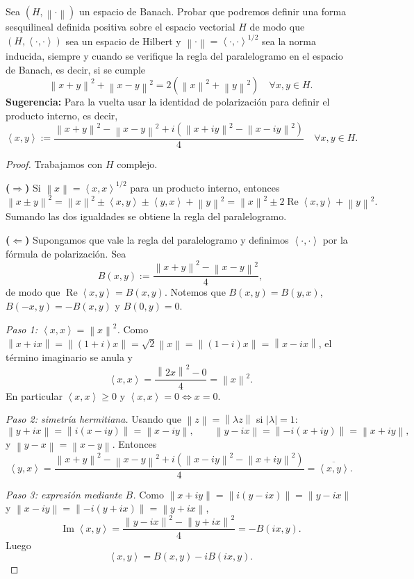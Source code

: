\documentclass{article}
\theoremstyle{definition}
\newcommand{\norm}[1]{\left\lVert #1 \right\rVert}       %
\newcommand{\ip}[2]{\left\langle #1, #2 \right\rangle}   %
\newcommand{\sii}{\iff}                                  %
\newenvironment{ejercicio}[1]{\begin{trivlist}
\item[\hskip \labelsep {\bfseries Ejercicio}\hskip \labelsep {\bfseries #1.}]}{\end{trivlist}}
\begin{document}
\begin{ejercicio}{2}
	Sea \( (H, \norm{\cdot}) \) un espacio de Banach. Probar que podremos definir una forma sesquilineal definida positiva sobre el espacio vectorial \( H \) de modo que \( (H, \ip{\cdot}{\cdot}) \) sea un espacio de Hilbert y \( \norm{\cdot} = \ip{\cdot}{\cdot}^{1/2} \) sea la norma inducida, siempre y cuando se verifique la regla del paralelogramo en el espacio de Banach, es decir, si se cumple
	\[ \norm{x+y}^2 + \norm{x-y}^2 = 2\left( \norm{x}^2 + \norm{y}^2 \right) \quad \forall x, y \in H. \]
	\textbf{Sugerencia:} Para la vuelta usar la identidad de polarización para definir el producto interno, es decir,
	\[ \ip{x}{y} := \frac{\norm{x+y}^2 - \norm{x-y}^2 + i \left( \norm{x+iy}^2 - \norm{x-iy}^2 \right)}{4} \quad \forall x, y \in H. \]
\end{ejercicio}
\begin{proof}
	Trabajamos con \( H \) complejo.

	\textbf{(\(\Rightarrow \))} Si \( \norm{x} = \ip{x}{x}^{1/2} \) para un producto interno, entonces
	\[ \norm{x \pm y}^2 = \norm{x}^2 \pm \ip{x}{y} \pm \ip{y}{x} + \norm{y}^2 = \norm{x}^2 \pm 2\operatorname{Re}\ip{x}{y} + \norm{y}^2. \]
	Sumando las dos igualdades se obtiene la regla del paralelogramo.

	\textbf{(\(\Leftarrow \))} Supongamos que vale la regla del paralelogramo y definimos \( \ip{\cdot}{\cdot} \) por la fórmula de polarización. Sea
	\[ B(x, y) := \frac{\norm{x+y}^2 - \norm{x-y}^2}{4}, \]
	de modo que \( \operatorname{Re}\ip{x}{y} = B(x, y) \). Notemos que \( B(x, y) = B(y, x) \), \( B(-x, y) = -B(x, y) \) y \( B(0, y) = 0 \).

	\emph{Paso 1: \( \ip{x}{x} = \norm{x}^2 \).} Como \( \norm{x + ix} = \norm{(1+i)x} = \sqrt{2}\norm{x} = \norm{(1-i)x} = \norm{x - ix} \), el término imaginario se anula y
	\[ \ip{x}{x} = \frac{\norm{2x}^2 - 0}{4} = \norm{x}^2. \]
	En particular \( \ip{x}{x} \ge 0 \) y \( \ip{x}{x} = 0 \sii x = 0 \).

	\emph{Paso 2: simetría hermitiana.} Usando que \( \norm{z} = \norm{\lambda z} \) si \( |\lambda| = 1 \):
	\[ \norm{y + ix} = \norm{i(x - iy)} = \norm{x - iy}, \qquad \norm{y - ix} = \norm{-i(x + iy)} = \norm{x + iy}, \]
	y \( \norm{y - x} = \norm{x - y} \). Entonces
	\[ \ip{y}{x} = \frac{\norm{x+y}^2 - \norm{x-y}^2 + i \left( \norm{x-iy}^2 - \norm{x+iy}^2 \right)}{4} = \overline{\ip{x}{y}}. \]

	\emph{Paso 3: expresión mediante \( B \).} Como \( \norm{x + iy} = \norm{i(y - ix)} = \norm{y - ix} \) y \( \norm{x - iy} = \norm{-i(y + ix)} = \norm{y + ix} \),
	\[ \operatorname{Im}\ip{x}{y} = \frac{\norm{y - ix}^2 - \norm{y + ix}^2}{4} = -B(ix, y). \]
	Luego
	\[ \ip{x}{y} = B(x, y) - i B(ix, y). \]


\end{proof}
\end{document}
